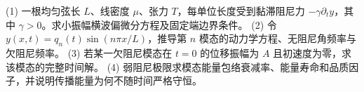 (1) 一根均匀弦长 \(L\)、线密度 \(\mu\)、张力 \(T\)，每单位长度受到黏滞阻尼力 \(-\gamma\partial_t y\)，其中 \(\gamma>0\)。求小振幅横波偏微分方程及固定端边界条件。
(2) 令 \(y(x,t)=q_n(t)\sin(n\pi x/L)\)，推导第 \(n\) 模态的动力学方程、无阻尼角频率与欠阻尼频率。
(3) 若某一欠阻尼模态在 \(t=0\) 的位移振幅为 \(A\) 且初速度为零，求该模态的完整时间解。
(4) 弱阻尼极限求模态能量包络衰减率、能量寿命和品质因子，并说明传播能量为何不随时间严格守恒。
